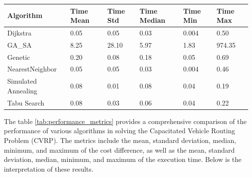 \documentclass{article}
\begin{document}
\begin{table}[h!]
        \begin{tabularx}{\textwidth}{|l|X|X|X|X|X|}
            \hline
            \textbf{Algorithm}  & \textbf{Time Mean} & \textbf{Time Std} & \textbf{Time Median} & \textbf{Time Min} & \textbf{Time Max} \\
            \hline
            Dijkstra            & 0.05               & 0.05              & 0.03                 & 0.004             & 0.50              \\
            GA\_SA              & 8.25               & 28.10             & 5.97                 & 1.83              & 974.35            \\
            Genetic             & 0.20               & 0.08              & 0.18                 & 0.05              & 0.69              \\
            NearestNeighbor     & 0.05               & 0.05              & 0.03                 & 0.004             & 0.46              \\
            Simulated Annealing & 0.08               & 0.01              & 0.08                 & 0.04              & 0.19              \\
            Tabu Search         & 0.08               & 0.03              & 0.06                 & 0.04              & 0.22              \\
            \hline
        \end{tabularx}
    \end{table}


    The table \ref{tab:performance_metrics} provides a comprehensive comparison of the performance of various algorithms in solving the Capacitated Vehicle Routing Problem (CVRP). The metrics include the mean, standard deviation, median, minimum, and maximum of the cost difference, as well as the mean, standard deviation, median, minimum, and maximum of the execution time. Below is the interpretation of these results.
\end{document}
